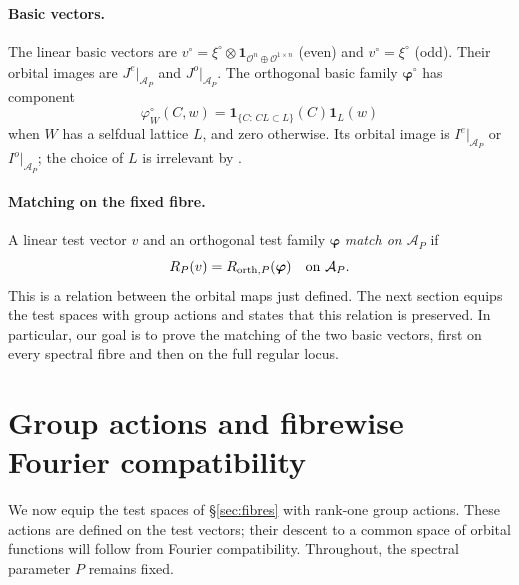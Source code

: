 \documentclass[11pt,oneside,notitlepage]{book}
\numberwithin{equation}{section}
\theoremstyle{plain}
\theoremstyle{definition}
\newcommand{\cO}{\mathcal{O}}
\newcommand{\one}{\mathbf{1}}
\begin{document}
\paragraph{Basic vectors.} The linear basic vectors are $v^\circ=\xi^\circ\otimes\one_{\cO^n\oplus\cO^{1\times n}}$ (even) and $v^\circ=\xi^\circ$ (odd). Their orbital images are $J^e|_{\mathcal A_P}$ and $J^o|_{\mathcal A_P}$. The orthogonal basic family $\boldsymbol\varphi^\circ$ has component
\[
 \varphi_W^\circ(C,w)=\one_{\{C:\,CL\subset L\}}(C)\one_L(w)
\]
when $W$ has a selfdual lattice $L$, and zero otherwise. Its orbital image is $I^e|_{\mathcal A_P}$ or $I^o|_{\mathcal A_P}$; the choice of $L$ is irrelevant by .

\paragraph{Matching on the fixed fibre.}
A linear test vector $v$ and an orthogonal test family $\boldsymbol\varphi$ \emph{match on $\mathcal A_P$} if
\[
 R_P(v)=R_{{\rm orth},P}(\boldsymbol\varphi)
 \quad\text{on }\mathcal A_P.
\]
This is a relation between the orbital maps just defined. The next section equips the test spaces with group actions and states that this relation is preserved. In particular, our goal is to prove the matching of the two basic vectors, first on every spectral fibre and then on the full regular locus.

\section{Group actions and fibrewise Fourier compatibility}\label{sec:actions}

We now equip the test spaces of \S\ref{sec:fibres} with rank-one group actions. These actions are defined on the test vectors; their descent to a common space of orbital functions will follow from Fourier compatibility. Throughout, the spectral parameter $P$ remains fixed.
\end{document}
